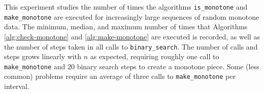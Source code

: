 




This experiment studies the number of times the algorithms {\tt is\_monotone} and {\tt make\_monotone} are executed for increasingly large sequences of random monotone data. The minimum, median, and maximum number of times that Algorithms \ref{alg:check-monotone} and \ref{alg:make-monotone} are executed is recorded, as well as the number of steps taken in all calls to {\tt binary\_search}. The number of calls and steps grows linearly with $n$ as expected, requiring roughly one call to {\tt make\_monotone} and $20$ binary search steps to create a monotone piece. Some (less common) problems require an average of three calls to {\tt make\_monotone} per interval.

